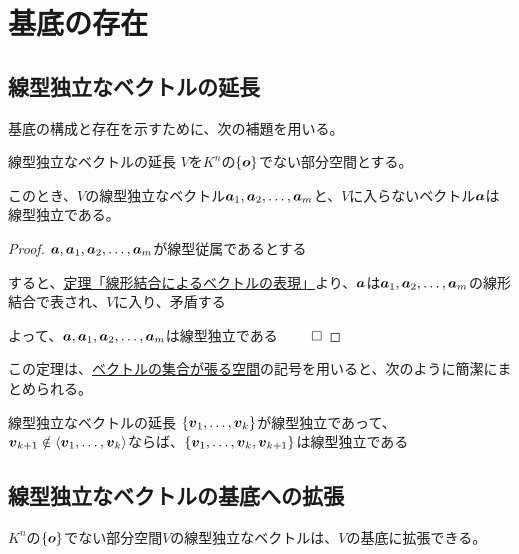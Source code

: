\documentclass[../../../topic_linear-algebra]{subfiles}
\begin{document}
\sectionline
\section{基底の存在}

\subsection{線型独立なベクトルの延長}

基底の構成と存在を示すために、次の補題を用いる。

\begin{theorem}{線型独立なベクトルの延長}\label{thm:extend-indep-outside-subspace}
  $V$を$K^n$の$\{\vb*{o} \}$でない部分空間とする。

  このとき、$V$の線型独立なベクトル$\vb*{a}_1, \vb*{a}_2, \dots, \vb*{a}_m$と、$V$に入らないベクトル$\vb*{a}$は線型独立である。
\end{theorem}

\begin{proof}
  $\vb*{a}, \vb*{a}_1, \vb*{a}_2, \dots, \vb*{a}_m$が線型従属であるとする

  すると、\hyperref[thm:dep-vec-is-lincomb]{定理「線形結合によるベクトルの表現」}より、$\vb*{a}$は$\vb*{a}_1, \vb*{a}_2, \dots, \vb*{a}_m$の線形結合で表され、$V$に入り、矛盾する

  よって、$\vb*{a}, \vb*{a}_1, \vb*{a}_2, \dots, \vb*{a}_m$は線型独立である $\qed$
\end{proof}

\br

この定理は、\hyperref[def:span-of-vectors]{ベクトルの集合が張る空間}の記号を用いると、次のように簡潔にまとめられる。

\begin{theorem}{線型独立なベクトルの延長}
  $\{ \vb*{v}_1, \dots, \vb*{v}_k \}$が線型独立であって、$\vb*{v}_{k+1} \notin \langle \vb*{v}_1, \dots, \vb*{v}_k \rangle$ならば、$\{ \vb*{v}_1, \dots, \vb*{v}_k, \vb*{v}_{k+1} \}$は線型独立である
\end{theorem}

\subsection{線型独立なベクトルの基底への拡張}

$K^n$の$\{\vb*{o} \}$でない部分空間$V$の線型独立なベクトルは、$V$の基底に拡張できる。
\end{document}
